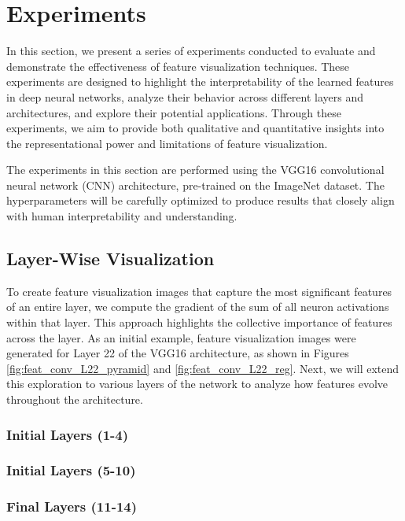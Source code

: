 \section{Experiments}

In this section, we present a series of experiments conducted to evaluate and demonstrate the effectiveness of feature visualization techniques. 
These experiments are designed to highlight the interpretability of the learned features in deep neural networks, analyze their behavior across different layers and architectures, and explore their potential applications. 
Through these experiments, we aim to provide both qualitative and quantitative insights into the representational power and limitations of feature visualization.

The experiments in this section are performed using the VGG16 convolutional neural network (CNN) architecture, pre-trained on the ImageNet dataset. 
The hyperparameters will be carefully optimized to produce results that closely align with human interpretability and understanding.

\subsection{Layer-Wise Visualization}


To create feature visualization images that capture the most significant features of an entire layer, we compute the gradient of the sum of all neuron activations within that layer. This approach highlights the collective importance of features across the layer.
As an initial example, feature visualization images were generated for Layer 22 of the VGG16 architecture, as shown in Figures \ref{fig:feat_conv_L22_pyramid} and \ref{fig:feat_conv_L22_reg}.
Next, we will extend this exploration to various layers of the network to analyze how features evolve throughout the architecture.

\subsubsection{Initial Layers (1-4)}

\subsubsection{Initial Layers (5-10)}

\subsubsection{Final Layers (11-14)}


